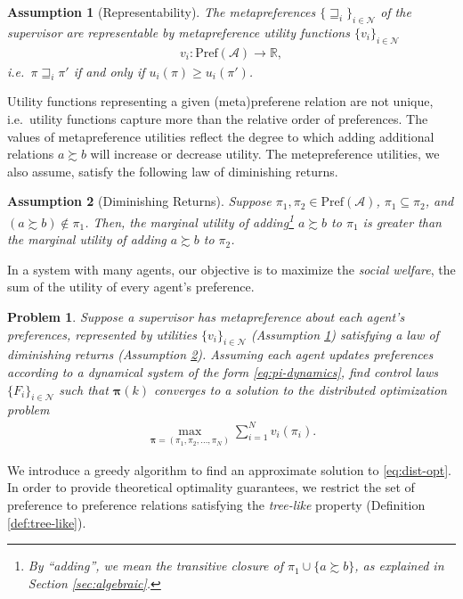\documentclass[conference]{ieeeconf}
\newcommand{\R}{\mathbb{R}}
\newcommand{\N}{\mathcal{N}}
\newcommand{\A}{\mathcal{A}}
\newcommand{\Pref}{\mathrm{Pref}}
\newcommand{\prefers}{\succsim}
\newcommand{\metaprefers}{\sqsupseteq}
\renewcommand{\geq}{\geqslant}
\newtheorem{assumption}{Assumption}
\newtheorem{problem}{Problem}
\begin{document}
\begin{assumption}[Representability] \label{ass:represent}
    The metapreferences $\{ \metaprefers_i \}_{i \in \N}$ of the supervisor are representable by \emph{metapreference utility} functions $\{ v_i \}_{i \in \N}$
    \begin{align}
        v_i : \Pref(\A) \to \R, \label{eq:utility-meta}
    \end{align}
    i.e.~$\pi \metaprefers_i \pi'$ if and only if $u_i(\pi) \geq u_i(\pi')$.
\end{assumption}

Utility functions representing a given (meta)preferene relation are not unique, i.e.~utility functions capture more than the relative order of preferences. The values of metapreference utilities reflect the degree to which adding additional relations $a \prefers b$ will increase or decrease utility. The metepreference utilities, we also assume, satisfy the following law of diminishing returns.

\begin{assumption}[Diminishing Returns] \label{ass:diminishing}
    Suppose $\pi_1, \pi_2 \in \Pref(\A)$, $\pi_1 \subseteq \pi_2$, and $(a \prefers b) \notin \pi_1$. Then, the marginal utility of adding\footnote{By ``adding'', we mean the transitive closure of $\pi_1 \cup \{a \prefers b\}$, as explained in Section \ref{sec:algebraic}.} $a \prefers b$ to $\pi_1$ is greater than the marginal utility of adding $a \prefers b$ to $\pi_2$.
\end{assumption}

In a system with many agents, our objective is to maximize the \emph{social welfare}, the sum of the utility of every agent's preference.
\begin{problem}
    Suppose a supervisor has metapreference about each agent's preferences, represented by utilities $\{v_i\}_{i \in \N}$ (Assumption \ref{ass:represent}) satisfying a law of diminishing returns (Assumption \ref{ass:diminishing}). Assuming each agent updates preferences according to a dynamical system of the form \eqref{eq:pi-dynamics}, find control laws $\{F_i\}_{i \in \N}$ such that $\boldsymbol{\pi}(k)$ converges to a solution to the distributed optimization problem
\begin{align}
    \max_{\boldsymbol{\pi} = (\pi_1,\pi_2,\dots,\pi_N)} \sum_{i=1}^N v_i(\pi_i). \label{eq:dist-opt}
\end{align}
\end{problem}

We introduce a greedy algorithm to find an approximate solution to \eqref{eq:dist-opt}. In order to provide theoretical optimality guarantees, we restrict the set of preference to preference relations satisfying the \emph{tree-like} property  (Definition \ref{def:tree-like}).
\end{document}
